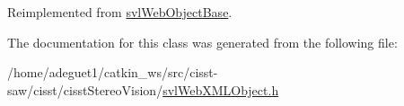 Reimplemented from \hyperlink{classsvl_web_object_base_aba1bc2e58179cde28f5f9fa1622b8434}{svl\-Web\-Object\-Base}.



The documentation for this class was generated from the following file\-:\begin{DoxyCompactItemize}
\item 
/home/adeguet1/catkin\-\_\-ws/src/cisst-\/saw/cisst/cisst\-Stereo\-Vision/\hyperlink{svl_web_x_m_l_object_8h}{svl\-Web\-X\-M\-L\-Object.\-h}\end{DoxyCompactItemize}
